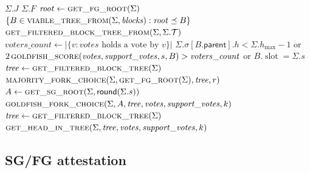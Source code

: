 \documentclass{article}
\theoremstyle{plain}
\theoremstyle{definition}
\theoremstyle{remark}
\newcommand{\slot}{\operatorname{slot}}
\newcommand{\parent}{\mathsf{parent}}
\newcommand{\round}{\mathsf{round}}
\newcommand{\T}{\mathcal T}
\newcommand{\hmax}{h_{\max}}
\newcommand{\fname}[1]{\text{\textsc{#1}}}
\begin{document}
{\begin{algorithmic}[1]
  \If{$\Sigma.\hmax=\Sigma.h_j+1$} \State \Return $\Sigma.J$ \EndIf
  \State \Return $\Sigma.F$
\EndFunction
\vspace{1pt}
  \State $\mathit{root}\gets\Call{get\_fg\_root}{\Sigma}$
  \State \Return
    $\{B\in\Call{viable\_tree\_from}{\Sigma,\mathit{blocks}}:
      \mathit{root}\preceq B\}$
\EndFunction
\vspace{1pt}
  \State \Return
    $\Call{get\_filtered\_block\_tree\_from}{\Sigma,\Sigma.\T}$
\EndFunction
\vspace{1pt}
  \State $\mathit{voters\_count}\gets
    |\{v:\mathit{votes}\text{ holds a vote by }v\}|$
  \State \Return $\Sigma.\sigma[B.\parent].h<\Sigma.\hmax-1$
    or $2\,\Call{goldfish\_score}{\mathit{votes},
      \mathit{support\_votes},s,B}>\mathit{voters\_count}$
    or $B.\slot=\Sigma.s$
\EndFunction
\vspace{1pt}
  \State $\mathit{tree}\gets\Call{get\_filtered\_block\_tree}{\Sigma}$
  \State \Return $\Call{majority\_fork\_choice}{\Sigma,
    \fname{get\_fg\_root}(\Sigma),\mathit{tree},r}$
\EndFunction
\vspace{1pt}
  \State $A\gets\Call{get\_sg\_root}{\Sigma,\round(\Sigma.s)}$
  \State \Return $\Call{goldfish\_fork\_choice}{\Sigma,A,
    \mathit{tree},\mathit{votes},\mathit{support\_votes},k}$
\EndFunction
\vspace{1pt}
  \State $\mathit{tree}\gets\Call{get\_filtered\_block\_tree}{\Sigma}$
  \State \Return $\Call{get\_head\_in\_tree}{\Sigma,\mathit{tree},
    \mathit{votes},\mathit{support\_votes},k}$
\EndFunction
\end{algorithmic}
}

\subsection{SG/FG attestation}
\end{document}

